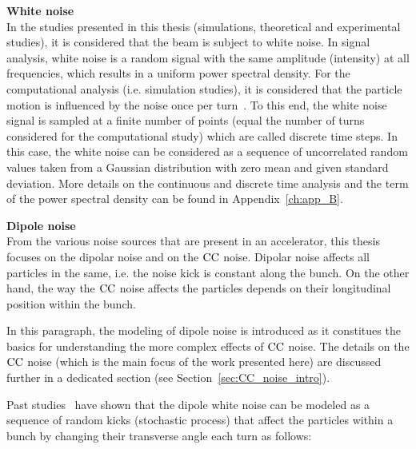 \textbf{White noise}\\
In the studies presented in this thesis (simulations, theoretical and experimental studies), it is considered that the beam is subject to white noise. In signal analysis, white noise is a random signal with the same amplitude (intensity) at all frequencies, which results in a uniform power spectral density. For the computational analysis (i.e. simulation studies), it is considered that the particle motion is influenced by the noise once per turn~\cite{Lebedev:248620, Lebedev:248622, PhysRevSTAB.18.101001}. To this end, the white noise signal is sampled at a finite number of points (equal the number of turns considered for the computational study) which are called discrete time steps. In this case, the white noise can be considered as a sequence of uncorrelated random values taken from a Gaussian distribution with zero mean and given standard deviation. More details on the continuous and discrete time analysis and the term of the power spectral density can be found in Appendix~\ref{ch:app_B}. %



\textbf{Dipole noise}\\
From the various noise sources that are present in an accelerator, this thesis focuses on the dipolar noise and on the ${\mathrm{CC}}$ noise. Dipolar noise affects all particles in the same, i.e. the noise kick is constant along the bunch.
On the other hand, the way the ${\mathrm{CC}}$ noise affects the particles depends on their longitudinal position within the bunch. 

In this paragraph, the modeling of dipole noise is introduced as it constitues the basics for understanding the more complex effects of ${\mathrm{CC}}$ noise. The details on the ${\mathrm{CC}}$ noise (which is the main focus of the work presented here) are discussed further in a dedicated section (see Section~\ref{sec:CC_noise_intro}). 

Past studies~\cite{Lebedev:248620, Lebedev:248622} have shown that the dipole white noise can be modeled as a sequence of random kicks (stochastic process) that affect the particles within a bunch by changing their transverse angle each turn as follows:


